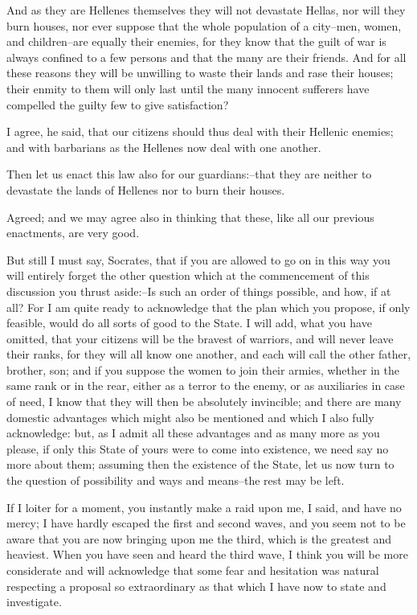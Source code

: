 And as they are Hellenes themselves they will not devastate Hellas, nor
will they burn houses, nor ever suppose that the whole population of a
city--men, women, and children--are equally their enemies, for they know
that the guilt of war is always confined to a few persons and that the
many are their friends. And for all these reasons they will be unwilling
to waste their lands and rase their houses; their enmity to them will
only last until the many innocent sufferers have compelled the guilty
few to give satisfaction?

I agree, he said, that our citizens should thus deal with their Hellenic
enemies; and with barbarians as the Hellenes now deal with one another.

Then let us enact this law also for our guardians:--that they are
neither to devastate the lands of Hellenes nor to burn their houses.

Agreed; and we may agree also in thinking that these, like all our
previous enactments, are very good.

But still I must say, Socrates, that if you are allowed to go on in
this way you will entirely forget the other question which at the
commencement of this discussion you thrust aside:--Is such an order of
things possible, and how, if at all? For I am quite ready to acknowledge
that the plan which you propose, if only feasible, would do all sorts of
good to the State. I will add, what you have omitted, that your citizens
will be the bravest of warriors, and will never leave their ranks, for
they will all know one another, and each will call the other father,
brother, son; and if you suppose the women to join their armies, whether
in the same rank or in the rear, either as a terror to the enemy, or as
auxiliaries in case of need, I know that they will then be absolutely
invincible; and there are many domestic advantages which might also be
mentioned and which I also fully acknowledge: but, as I admit all these
advantages and as many more as you please, if only this State of yours
were to come into existence, we need say no more about them; assuming
then the existence of the State, let us now turn to the question of
possibility and ways and means--the rest may be left.

If I loiter for a moment, you instantly make a raid upon me, I said, and
have no mercy; I have hardly escaped the first and second waves, and you
seem not to be aware that you are now bringing upon me the third, which
is the greatest and heaviest. When you have seen and heard the third
wave, I think you will be more considerate and will acknowledge
that some fear and hesitation was natural respecting a proposal so
extraordinary as that which I have now to state and investigate.

